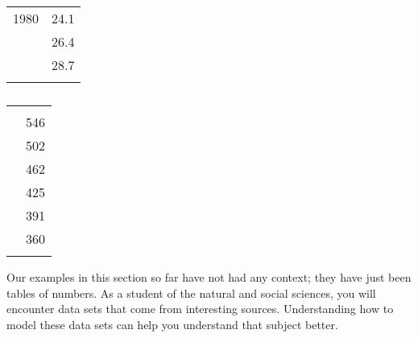 \begin{doyouunderstand}
\begin{table}[!htb]
\begin{minipage}{0.20\textwidth}
\begin{tabular}{S[table-format=4.0]S[table-format=2.3]}
				1980          & 24.1          \\          & 26.4          \\          & 28.7          \\\lastline
			\end{tabular}
		\end{minipage}
		\hfill
		\begin{minipage}{0.20\textwidth}
			\centering
			\caption{}\label{exp:tab:dataexample8}
			\begin{tabular}{S[table-format=2.0]S[table-format=3.0]}
				\beforeheading
				 &  \\
				             & 546           \\             & 502           \\             & 462           \\            & 425           \\            & 391           \\            & 360           \\\lastline
			\end{tabular}
		\end{minipage}
		\hfill\null
	\end{table}
\end{doyouunderstand}
Our examples in this section so far have not had any context; they have just been tables of numbers.  As a student of the natural and social sciences, you will encounter data sets that come from interesting sources.  Understanding how to model these data sets can help you understand that subject better.
			
